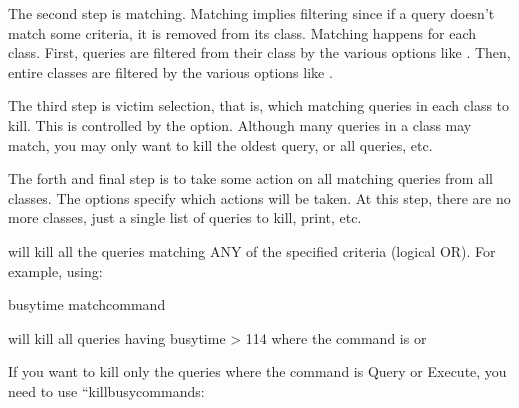 \documentclass[letterpaper,10pt,english]{sphinxmanual}
\begin{document}
\sphinxAtStartPar
The second step is matching.  Matching implies filtering since if a query
doesn’t match some criteria, it is removed from its class.
Matching happens for each class.  First, queries are filtered from their
class by the various  options like {\hyperref[\detokenize{mariadb-kill:cmdoption-mariadb-kill-match-user}]{}}.
Then, entire classes are filtered by the various  options
like {\hyperref[\detokenize{mariadb-kill:cmdoption-mariadb-kill-query-count}]{}}.

\sphinxAtStartPar
The third step is victim selection, that is, which matching queries in each
class to kill.  This is controlled by the {\hyperref[\detokenize{mariadb-kill:cmdoption-mariadb-kill-victims}]{}} option.  Although
many queries in a class may match, you may only want to kill the oldest
query, or all queries, etc.

\sphinxAtStartPar
The forth and final step is to take some action on all matching queries
from all classes.  The  options specify which actions will be
taken.  At this step, there are no more classes, just a single list of
queries to kill, print, etc.

\sphinxAtStartPar
{} will kill all the queries matching ANY of the specified criteria (logical OR).
For example, using:

\begin{sphinxVerbatim}[commandchars=\\\{\}]
\PYGZhy{}\PYGZhy{}busy\PYGZhy{}time  \PYGZhy{}\PYGZhy{}match\PYGZhy{}command 
\end{sphinxVerbatim}

\sphinxAtStartPar
will kill all queries having busy\sphinxhyphen{}time \textgreater{} 114  where the command is  or 

\sphinxAtStartPar
If you want to kill only the queries where  the command is Query or
Execute, you need to use “\textendash{}kill\sphinxhyphen{}busy\sphinxhyphen{}commands:
\end{document}
